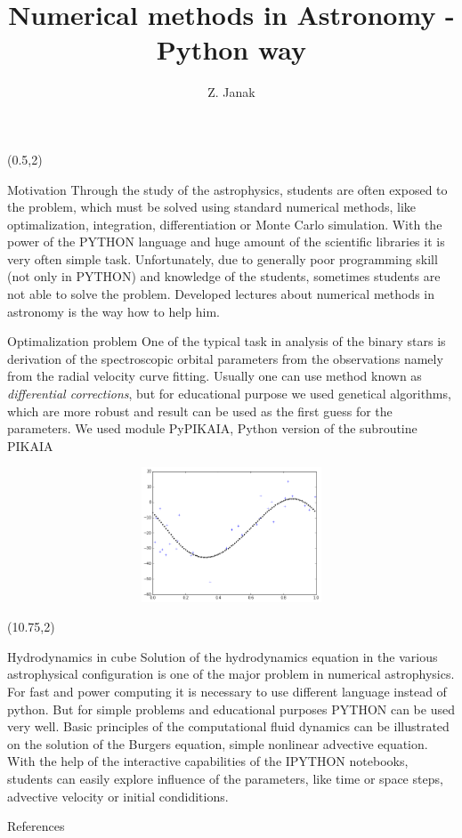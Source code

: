 \documentclass[unknownkeysallowed]{beamer}
\title{Numerical methods in Astronomy - Python way}
\author{Z. Janak}
\date{}
\begin{document}
\begin{frame}{} 

\begin{textblock}{9.75}(0.5,2)
\begin{block}{Motivation}
Through the study of the astrophysics, students are often exposed to the problem,
which must be solved using standard numerical methods, like optimalization, integration,
differentiation or Monte Carlo simulation. With the power of the PYTHON language and 
huge amount of the scientific libraries it is very often simple task. Unfortunately,
due to generally poor programming skill (not only in PYTHON) and knowledge of the students, 
sometimes students are not able to solve the problem. Developed lectures about numerical
 methods in astronomy is the way how to help him.
\end{block}

\begin{block}{Optimalization problem}
One of the typical task in analysis of the binary stars is derivation of the spectroscopic orbital parameters from the observations namely from the radial velocity curve fitting. Usually one can use method known as {\it differential corrections}, but for educational purpose we used genetical algorithms, which are more robust and result can be used as the first guess for the parameters. We used module PyPIKAIA, Python version
of the subroutine PIKAIA 
\begin{figure}
\includegraphics[width=1\textwidth, height=4cm]{radialvelocity.png}
\end{figure}
\end{block}
\end{textblock}

\begin{textblock}{9.5}(10.75,2)
\begin{block}{Hydrodynamics in cube}
Solution of the hydrodynamics equation in the various astrophysical configuration is one of the 
major problem in numerical astrophysics. For fast and power computing it is necessary to use different language instead of python. But for
simple problems and educational purposes PYTHON can be used very well. Basic principles of the computational fluid dynamics can be illustrated on the solution of the
Burgers equation, simple nonlinear advective equation. With the help of the interactive capabilities of the IPYTHON notebooks, students can 
easily explore influence of the parameters, like time or space steps, advective velocity or initial condiditions.
\end{block}

\begin{block}{References}


\end{block}
\end{textblock}

\end{frame}
\end{document}
